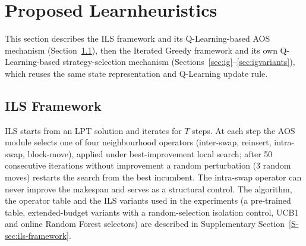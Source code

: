 \documentclass[final,3p,times,11pt,authoryear]{elsarticle}
\begin{document}
\section{Proposed Learnheuristics}
\label{sec:method}

This section describes the ILS framework and its Q-Learning-based AOS
mechanism (Section~\ref{sec:ils}), then the
Iterated Greedy framework and its own Q-Learning-based
strategy-selection mechanism (Sections~\ref{sec:ig}--\ref{sec:igvariants}),
which reuses the same state representation and Q-Learning update rule.

\subsection{ILS Framework}
\label{sec:ils}

ILS starts from an LPT solution and iterates for $T$ steps. At each step the AOS module selects one of four neighbourhood
operators (inter-swap, reinsert, intra-swap, block-move), applied under best-improvement local search; after 50 consecutive
iterations without improvement a random perturbation (3 random moves) restarts the search from the best incumbent. The
intra-swap operator can never improve the makespan and serves as a structural control. The algorithm, the operator table
and the ILS variants used in the experiments (a pre-trained table, extended-budget variants with a random-selection
isolation control, UCB1 and online Random Forest selectors) are described in Supplementary Section~\ref{S-sec:ils-framework}.
\end{document}
